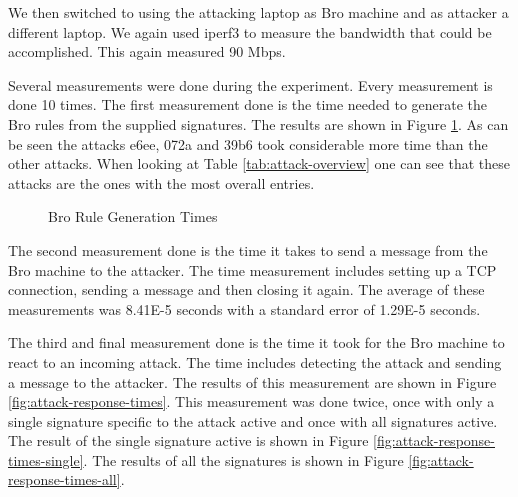 We then switched to using the attacking laptop as Bro machine and as attacker a different laptop. We again used iperf3 to measure the bandwidth that could be accomplished. This again measured 90 Mbps.  

Several measurements were done during the experiment. Every measurement is done 10 times. The first measurement done is the time needed to generate the Bro rules from the supplied signatures. The results are shown in Figure \ref{fig:generation-times}. As can be seen the attacks e6ee, 072a and 39b6 took considerable more time than the other attacks. When looking at Table \ref{tab:attack-overview} one can see that these attacks are the ones with the most overall entries. 


\begin{figure}[H]
\centering
{}
\caption{Bro Rule Generation Times}
\label{fig:generation-times}
\end{figure}

The second measurement done is the time it takes to send a message from the Bro machine to the attacker. The time measurement includes setting up a TCP connection, sending a message and then closing it again. The average of these measurements was 8.41E-5 seconds with a standard error of 1.29E-5 seconds. 

The third and final measurement done is the time it took for the Bro machine to react to an incoming attack. The time includes detecting the attack and sending a message to the attacker. The results of this measurement are shown in Figure \ref{fig:attack-response-times}. This measurement was done twice, once with only a single signature specific to the attack active and once with all signatures active. The result of the single signature active is shown in Figure \ref{fig:attack-response-times-single}. The results of all the signatures is shown in Figure \ref{fig:attack-response-times-all}. 

